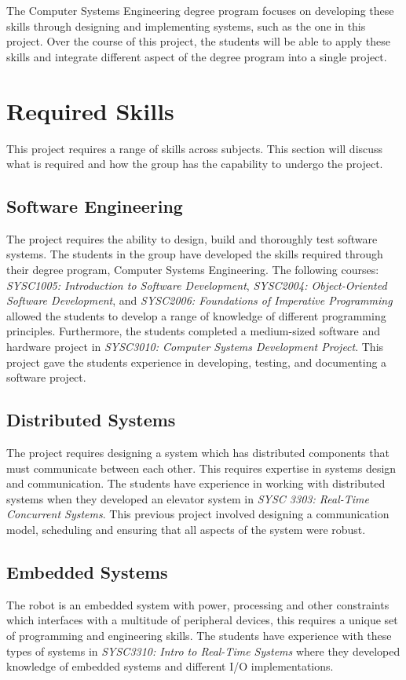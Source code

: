 \documentclass[12pt]{report}
\begin{document}
The Computer Systems Engineering degree program focuses on developing these skills through designing and implementing systems, such as the one in this project. Over the course of this project, the students will be able to apply these skills and integrate different aspect of the degree program into a single project.


\section{Required Skills}
This project requires a range of skills across subjects. This section will discuss what is required and how the group has the capability to undergo the project.

\subsection{Software Engineering}
The project requires the ability to design, build and thoroughly test software systems. The students in the group have developed the skills required through their degree program, Computer Systems Engineering. The following courses: \textit{SYSC1005: Introduction to Software Development}, \textit{SYSC2004: Object-Oriented Software Development}, and \textit{SYSC2006: Foundations of Imperative Programming} allowed the students to develop a range of knowledge of different programming principles. Furthermore, the students completed a medium-sized software and hardware project in \textit{SYSC3010: Computer Systems Development Project}. This project gave the students experience in developing, testing, and documenting a software project.

\subsection{Distributed Systems}
The project requires designing a system which has distributed components that must communicate between each other. This requires expertise in systems design and communication. The students have experience in working with distributed systems when they developed an elevator system in \textit{SYSC 3303: Real-Time Concurrent Systems}. This previous project involved designing a communication model, scheduling and ensuring that all aspects of the system were robust.

\subsection{Embedded Systems}
The robot is an embedded system with power, processing and other constraints which interfaces with a multitude of peripheral devices, this requires a unique set of programming and engineering skills. The students have experience with these types of systems in \textit{SYSC3310: Intro to Real-Time Systems} where they developed knowledge of embedded systems and different I/O implementations.
\end{document}
